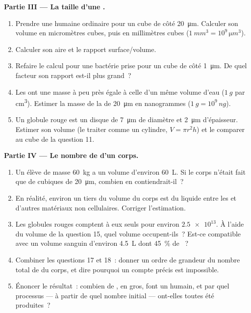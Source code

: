 \begin{problem}
\medskip
\noindent\textbf{Partie III --- La taille d'une .}
\begin{enumerate}[resume]
  \item Prendre une  humaine ordinaire pour un cube de côté
        \qty{20}{\micro m}. Calculer son volume en micromètres cubes,
        puis en millimètres cubes
        ($\qty{1}{mm^3} = 10^9\,\unit{\micro m^3}$).
  \item Calculer son aire et le rapport surface/volume.
  \item Refaire le calcul pour une bactérie prise pour un cube de côté
        \qty{1}{\micro m}. De quel facteur son rapport est-il plus
        grand~?
  \item Les  ont une masse à peu près égale à celle d'un même
        volume d'eau ($\qty{1}{g}$ par \unit{cm^3}). Estimer la masse
        de la  de \qty{20}{\micro m} en nanogrammes
        ($\qty{1}{g} = 10^9\,\unit{ng}$).
  \item Un globule rouge est un disque de \qty{7}{\micro m} de
        diamètre et \qty{2}{\micro m} d'épaisseur. Estimer son volume
        (le traiter comme un cylindre, $V = \pi r^2 h$) et le comparer
        au cube de la question 11.
\end{enumerate}

\medskip
\noindent\textbf{Partie IV --- Le nombre de  d'un corps.}
\begin{enumerate}[resume]
  \item Un élève de masse \qty{60}{kg} a un volume d'environ
        \qty{60}{L}. Si le corps n'était fait que de  cubiques
        de \qty{20}{\micro m}, combien en contiendrait-il~?
  \item En réalité, environ un tiers du volume du corps est du liquide
        entre les  et d'autres matériaux non cellulaires.
        Corriger l'estimation.
  \item Les globules rouges comptent à eux seuls pour environ
        $\num{2.5e13}$. À l'aide du volume de la question 15, quel
        volume occupent-ils~? Est-ce compatible avec un volume sanguin
        d'environ \qty{4.5}{L} dont 45~\% de ~?
  \item Combiner les questions 17 et 18~: donner un ordre de grandeur
        du nombre total de  du corps, et dire pourquoi un
        compte précis est impossible.
  \item Énoncer le résultat~: combien de , en gros, font un
        humain, et par quel processus --- à partir de quel nombre
        initial --- ont-elles toutes été produites~?
\end{enumerate}
\end{problem}
